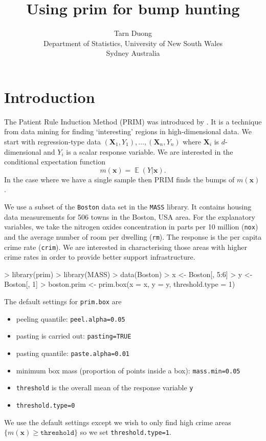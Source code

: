 \documentclass[a4paper,11pt]{article}
\title{Using prim for bump hunting}
\author{Tarn Duong \\ Department of Statistics, University of New South Wales \\ Sydney Australia}
\renewcommand{\vec}[1]{\boldsymbol{#1}}
\DeclareMathOperator{\E}{\boldsymbol{\mathbb{E}}}
\def\vecx{\vec{x}}
\def\vecX{\vec{X}}
\begin{document}
\maketitle

\section{Introduction}

The Patient Rule Induction Method (PRIM) was introduced
by \citet*{friedman99}. It is a technique from data mining 
for finding `interesting' regions in high-dimensional data. 
We start with regression-type data $(\vecX_1, Y_1), \dots, (\vecX_n, Y_n)$
where $\vecX_i$ is $d$-dimensional and $Y_i$ is a scalar response variable.
We are interested in the conditional expectation function
$$
m(\vecx) = \E (Y | \vecx).    
$$
In the case where we have a single sample then PRIM
finds the bumps of $m(\vecx)$. 

We use a subset of the \texttt{Boston} 
data set in the \texttt{MASS} library. It contains
housing data measurements for 506 towns in the Boston, USA area.
For the explanatory variables, we
take the nitrogen oxides concentration in parts per 10 million (\texttt{nox}) 
and the average number of room per dwelling (\texttt{rm}). The 
response is the per capita crime rate (\texttt{crim}). 
We are interested in characterising those areas with higher crime rates
in order to provide better support infrastructure.

\begin{Schunk}
\begin{Sinput}
> library(prim)
> library(MASS)
> data(Boston)
> x <- Boston[, 5:6]
> y <- Boston[, 1]
> boston.prim <- prim.box(x = x, y = y, threshold.type = 1)
\end{Sinput}
\end{Schunk}
The default settings for \texttt{prim.box} are
\begin{itemize}
\item peeling quantile: \texttt{peel.alpha=0.05}
\item pasting is carried out: \texttt{pasting=TRUE} 
\item pasting quantile: \texttt{paste.alpha=0.01}
\item minimum box mass (proportion of points inside a box): 
 \texttt{mass.min=0.05} 
\item \texttt{threshold} is the overall mean of the response variable \texttt{y}
\item \texttt{threshold.type=0}
\end{itemize}
We use the default settings except we wish to only find high crime areas 
$\lbrace m(\vecx) \geq \texttt{threshold} \rbrace$
so we set \texttt{threshold.type=1}. 
\end{document}
